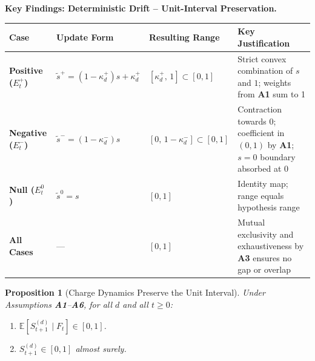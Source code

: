 \documentclass[12pt,openany]{book}
\numberwithin{equation}{chapter}
\theoremstyle{plain}
\newtheorem{proposition}[theorem]{Proposition}
\theoremstyle{definition}
\theoremstyle{remark}
\def\mathcal#1{#1}%
\begin{document}
\noindent\textbf{Key Findings: Deterministic Drift -- Unit-Interval
Preservation.}

\medskip
\begin{tabularx}{\linewidth}{@{}>{\footnotesize\bfseries}p{3.0cm}
    >{\footnotesize\raggedright\arraybackslash}p{5.0cm}
    >{\footnotesize\raggedright\arraybackslash}p{3.0cm}
    >{\footnotesize\raggedright\arraybackslash}X@{}}
\toprule
Case & Update Form & Resulting Range & Key Justification \\
\midrule
Positive ($E_t^{+}$)
  & $\tilde{s}^{+} = (1-\kappa_d^{+})s + \kappa_d^{+}$
  & $[\kappa_d^{+},\,1] \subset [0,1]$
  & Strict convex combination of $s$ and $1$; weights
    from \textbf{A1} sum to 1 \\[4pt]
Negative ($E_t^{-}$)
  & $\tilde{s}^{-} = (1-\kappa_d^{-})s$
  & $[0,\,1-\kappa_d^{-}] \subset [0,1]$
  & Contraction towards 0; coefficient in $(0,1)$ by
    \textbf{A1}; $s=0$ boundary absorbed at 0 \\[4pt]
Null ($E_t^{0}$)
  & $\tilde{s}^{0} = s$
  & $[0,1]$
  & Identity map; range equals hypothesis range \\[4pt]
All Cases
  & ---
  & $[0,1]$
  & Mutual exclusivity and exhaustiveness by \textbf{A3}
    ensures no gap or overlap \\
\bottomrule
\end{tabularx}

\begin{proposition}[Charge Dynamics Preserve the Unit Interval]
\label{prop:charge-bounded}
Under Assumptions \textbf{A1}--\textbf{A6}, for all $d$ and
all $t \geq 0$:
\begin{enumerate}
  \item $\mathbb{E}\!\left[\mathcal{S}_{t+1}^{(d)}
    \mid \mathcal{F}_t\right] \in [0,1]$.
  \item $\mathcal{S}_{t+1}^{(d)} \in [0,1]$ almost surely.
\end{enumerate}
\end{proposition}
\end{document}
